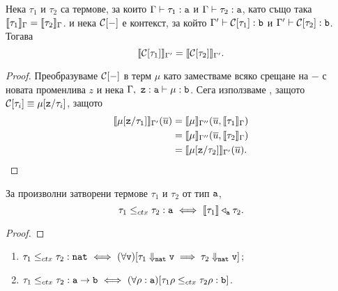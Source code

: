 \begin{proposition}\label{pr:pcf:compositionality}
  Нека $\tau_1$ и $\tau_2$ са термове, за които $\Gamma \vdash \tau_1 : \texttt{a}$ и $\Gamma \vdash \tau_2 : \texttt{a}$,
  като също така $\llbracket{\tau_1}\rrbracket_\Gamma = \llbracket{\tau_2}\rrbracket_\Gamma$.
  и нека $\mathcal{C}[-]$ е контекст, за който $\Gamma' \vdash \mathcal{C}[\tau_1] : \texttt{b}$ и $\Gamma' \vdash \mathcal{C}[\tau_2] : \texttt{b}$.
  Тогава
  \[\llbracket{\mathcal{C}[\tau_1]}\rrbracket_{\Gamma'} = \llbracket{\mathcal{C}[\tau_2]}\rrbracket_{\Gamma'}.\]
\end{proposition}
\begin{proof}
  Преобразуваме $\mathcal{C}[-]$ в терм $\mu$ като заместваме всяко срещане на $-$ с новата променлива $z$
  и нека $\Gamma,\ \texttt{z}:\texttt{a} \vdash \mu : \texttt{b}$.
  Сега използваме , защото $\mathcal{C}[\tau_i] \equiv \mu[\texttt{z}/{\tau_i}]$, защото
  \begin{align*}
    \llbracket{\mu[\texttt{z}/{\tau_1}]}\rrbracket_{\Gamma'}(\overline{u}) & = \llbracket{\mu}\rrbracket_{\Gamma''}(\overline{u},\llbracket{\tau_1}\rrbracket_\Gamma)\\
                                                 & = \llbracket{\mu}\rrbracket_{\Gamma''}(\overline{u},\llbracket{\tau_2}\rrbracket_\Gamma)\\
                                                 & = \llbracket{\mu[\texttt{z}/{\tau_2}]}\rrbracket_{\Gamma'}(\overline{u}).
  \end{align*}
\end{proof}


\begin{proposition}
  За произволни затворени термове $\tau_1$ и $\tau_2$ от тип $\texttt{a}$,
  \[\tau_1 \leq_{ctx} \tau_2 : \texttt{a} \ \Longleftrightarrow\  \llbracket{\tau_1}\rrbracket \triangleleft_{\texttt{a}} \tau_2.\]
\end{proposition}
\begin{proof}
  
\end{proof}


\begin{proposition}\label{pr:pcf:extensionality}
  \begin{enumerate}[1)]
  \item
    $\tau_1 \leq_{ctx} \tau_2 : \texttt{nat} \ \Longleftrightarrow\  (\forall \texttt{v})[\tau_1 \Downarrow_{\texttt{nat}} \texttt{v} \implies \tau_2    
    \Downarrow_{\texttt{nat}} \texttt{v}]$;
  \item
    $\tau_1 \leq_{ctx} \tau_2 : \texttt{a}\to\texttt{b} \ \Longleftrightarrow\  (\forall \rho:\texttt{a})[\tau_1\rho \leq_{ctx} \tau_2 \rho : \texttt{b}]$.
  \end{enumerate}
\end{proposition}


